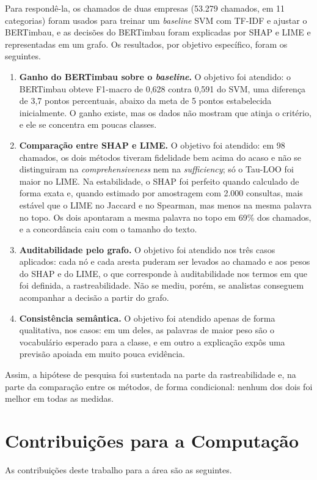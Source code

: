 \documentclass[
    12pt,                %
    openright,           %
    oneside,             %
    a4paper,             %
    english,             %
    brazil               %
]{abntex2}
\begin{document}
Para respondê-la, os chamados de duas empresas (53.279 chamados, em 11 categorias) foram usados para treinar um \textit{baseline} SVM com TF-IDF e ajustar o BERTimbau, e as decisões do BERTimbau foram explicadas por SHAP e LIME e representadas em um grafo. Os resultados, por objetivo específico, foram os seguintes.

\begin{enumerate}
    \item \textbf{Ganho do BERTimbau sobre o \textit{baseline}.} O objetivo foi atendido: o BERTimbau obteve F1-macro de 0,628 contra 0,591 do SVM, uma diferença de 3,7 pontos percentuais, abaixo da meta de 5 pontos estabelecida inicialmente. O ganho existe, mas os dados não mostram que atinja o critério, e ele se concentra em poucas classes.

    \item \textbf{Comparação entre SHAP e LIME.} O objetivo foi atendido: em 98 chamados, os dois métodos tiveram fidelidade bem acima do acaso e não se distinguiram na \textit{comprehensiveness} nem na \textit{sufficiency}; só o Tau-LOO foi maior no LIME. Na estabilidade, o SHAP foi perfeito quando calculado de forma exata e, quando estimado por amostragem com 2.000 consultas, mais estável que o LIME no Jaccard e no Spearman, mas menos na mesma palavra no topo. Os dois apontaram a mesma palavra no topo em 69\% dos chamados, e a concordância caiu com o tamanho do texto.

    \item \textbf{Auditabilidade pelo grafo.} O objetivo foi atendido nos três casos aplicados: cada nó e cada aresta puderam ser levados ao chamado e aos pesos do SHAP e do LIME, o que corresponde à auditabilidade nos termos em que foi definida, a rastreabilidade. Não se mediu, porém, se analistas conseguem acompanhar a decisão a partir do grafo.

    \item \textbf{Consistência semântica.} O objetivo foi atendido apenas de forma qualitativa, nos casos: em um deles, as palavras de maior peso são o vocabulário esperado para a classe, e em outro a explicação expôs uma previsão apoiada em muito pouca evidência.
\end{enumerate}

Assim, a hipótese de pesquisa foi sustentada na parte da rastreabilidade e, na parte da comparação entre os métodos, de forma condicional: nenhum dos dois foi melhor em todas as medidas.

\section{Contribuições para a Computação}
As contribuições deste trabalho para a área são as seguintes.
 
\end{document}
